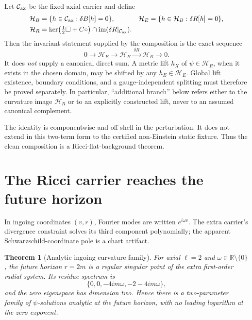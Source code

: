 \documentclass[11pt]{article}
\newtheorem{theorem}{Theorem}[section]
\theoremstyle{definition}
\theoremstyle{remark}
\newcommand{\R}{\mathbb R}
\begin{document}
Let \(\mathcal C_{\rm ax}\) be the fixed axial carrier and define
\begin{align}
 \mathcal H_B&=\{h\in\mathcal C_{\rm ax}:\delta B[h]=0\},&
 \mathcal H_E&=\{h\in\mathcal H_B:\delta R[h]=0\},\\
 \mathcal H_R&=\ker\!\left(\tfrac12\Box+C\circ\right)
                \cap\operatorname{im}(\delta R|_{\mathcal C_{\rm ax}}).
\end{align}
Then the invariant statement supplied by the composition is the exact
sequence
\begin{equation}\label{eq:axial-exact-sequence}
 0\longrightarrow\mathcal H_E
 \longrightarrow\mathcal H_B
 \xrightarrow{\ \delta R\ }\mathcal H_R
 \longrightarrow0.
\end{equation}
It does \emph{not} supply a canonical direct sum.  A metric lift \(h_X\) of
\(\psi\in\mathcal H_R\), when it exists in the chosen domain, may be shifted
by any \(h_E\in\mathcal H_E\).  Global lift existence, boundary conditions,
and a gauge-independent splitting must therefore be proved separately.  In
particular, ``additional branch'' below refers either to the curvature image
\(\mathcal H_R\) or to an explicitly constructed lift, never to an assumed
canonical complement.

The identity is componentwise and off shell in the perturbation.  It does
not extend in this two-term form to the certified non-Einstein static
fixture.  Thus the clean composition is a Ricci-flat-background theorem.

\section{The Ricci carrier reaches the future horizon}

In ingoing coordinates \((v,r)\), Fourier modes are written
\(e^{i\omega v}\).  The extra carrier's divergence constraint solves its
third component polynomially; the apparent Schwarzschild-coordinate pole is
a chart artifact.

\begin{theorem}[Analytic ingoing curvature family]
For axial \(\ell=2\) and \(\omega\in\R\setminus\{0\}\), the future horizon
\(r=2m\) is a regular singular point of the extra first-order radial system.
Its residue spectrum is
\begin{equation}
 \{0,0,-4im\omega,-2-4im\omega\},
\end{equation}
and the zero eigenspace has dimension two.  Hence there is a two-parameter
family of \(\psi\)-solutions analytic at the future horizon, with no leading
logarithm at the zero exponent.
\end{theorem}
\end{document}
